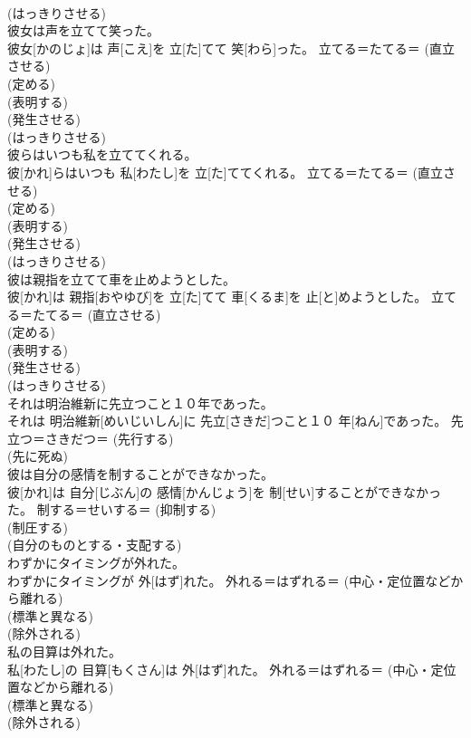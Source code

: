 \documentclass[8pt]{extreport}
\begin{document}
\begin{CJK}{UTF8}{min}
{\\	(はっきりさせる) 
\\	彼女は声を立てて笑った。	
\\	彼女[かのじょ]は 声[こえ]を 立[た]てて 笑[わら]った。	立てる＝たてる＝ (直立させる) 
\\	(定める) 
\\	(表明する) 
\\	(発生させる) 
\\	(はっきりさせる) 
\\	彼らはいつも私を立ててくれる。	
\\	彼[かれ]らはいつも 私[わたし]を 立[た]ててくれる。	立てる＝たてる＝ (直立させる) 
\\	(定める) 
\\	(表明する) 
\\	(発生させる) 
\\	(はっきりさせる) 
\\	彼は親指を立てて車を止めようとした。	
\\	彼[かれ]は 親指[おやゆび]を 立[た]てて 車[くるま]を 止[と]めようとした。	立てる＝たてる＝ (直立させる) 
\\	(定める) 
\\	(表明する) 
\\	(発生させる) 
\\	(はっきりさせる) 
\\	それは明治維新に先立つこと１０年であった。	
\\	それは 明治維新[めいじいしん]に 先立[さきだ]つこと１０ 年[ねん]であった。	先立つ＝さきだつ＝ (先行する) 
\\	(先に死ぬ) 
\\	彼は自分の感情を制することができなかった。	
\\	彼[かれ]は 自分[じぶん]の 感情[かんじょう]を 制[せい]することができなかった。	制する＝せいする＝ (抑制する) 
\\	(制圧する) 
\\	(自分のものとする・支配する) 
\\	わずかにタイミングが外れた。	
\\	わずかにタイミングが 外[はず]れた。	外れる＝はずれる＝ (中心・定位置などから離れる) 
\\	(標準と異なる) 
\\	(除外される) 
\\	私の目算は外れた。	
\\	私[わたし]の 目算[もくさん]は 外[はず]れた。	外れる＝はずれる＝ (中心・定位置などから離れる) 
\\	(標準と異なる) 
\\	(除外される) 
}
\end{CJK}
\end{document}
